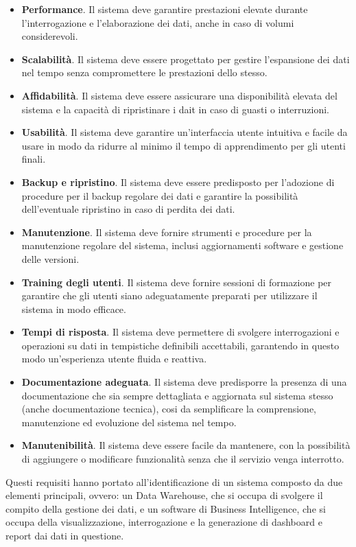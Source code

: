 \begin{itemize}
    \item \textbf{Performance}. Il sistema deve garantire prestazioni elevate durante l'interrogazione e l'elaborazione dei dati, anche in caso di volumi considerevoli.
    \item \textbf{Scalabilità}. Il sistema deve essere progettato per gestire l'espansione dei dati nel tempo senza compromettere le prestazioni dello stesso.
    \item \textbf{Affidabilità}. Il sistema deve essere assicurare una disponibilità elevata del sistema e la capacità di ripristinare i dait in caso di guasti o interruzioni.
    \item \textbf{Usabilità}. Il sistema deve garantire un'interfaccia utente intuitiva e facile da usare in modo da ridurre al minimo il tempo di apprendimento per gli utenti finali.
    \item \textbf{Backup e ripristino}. Il sistema deve essere predisposto per l'adozione di procedure per il backup regolare dei dati e garantire la possibilità dell'eventuale ripristino in caso di perdita dei dati.
    \item \textbf{Manutenzione}. Il sistema deve fornire strumenti e procedure per la manutenzione regolare del sistema, inclusi aggiornamenti software e gestione delle versioni.
    \item \textbf{Training degli utenti}. Il sistema deve fornire sessioni di formazione per garantire che gli utenti siano adeguatamente preparati per utilizzare il sistema in modo efficace.
    \item \textbf{Tempi di risposta}. Il sistema deve permettere di svolgere interrogazioni e operazioni su dati in tempistiche definibili accettabili, garantendo in questo modo un'esperienza utente fluida e reattiva.
    \item \textbf{Documentazione adeguata}. Il sistema deve predisporre la presenza di una documentazione che sia sempre dettagliata e aggiornata sul sistema stesso (anche documentazione tecnica), cosi da semplificare la comprensione, manutenzione ed evoluzione del sistema nel tempo.
    \item \textbf{Manutenibilità}. Il sistema deve essere facile da mantenere, con la possibilità di aggiungere o modificare funzionalità senza che il servizio venga interrotto.
\end{itemize}

Questi requisiti hanno portato all'identificazione di un sistema composto da due elementi principali, ovvero: un Data Warehouse, che si occupa di svolgere il compito della gestione dei dati, e un software di Business Intelligence, che si occupa della visualizzazione, interrogazione e la generazione di dashboard e report dai dati in questione.

